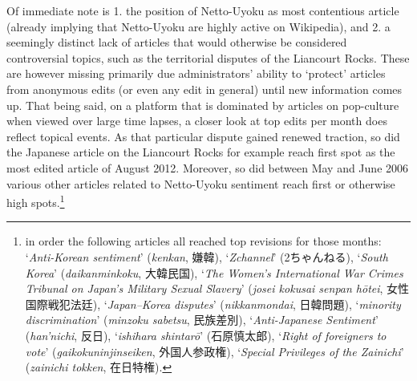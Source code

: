 \documentclass[10pt,british,A4paper,,openany]{memoir}
\begin{document}
Of immediate note is 1. the position of Netto-Uyoku as  most
contentious article (already implying that Netto-Uyoku are highly active
on Wikipedia), and 2. a seemingly distinct lack of articles that would
otherwise be considered controversial topics, such as the territorial
disputes of the Liancourt Rocks. These are however missing primarily due
administrators' ability to `protect' articles from anonymous edits (or
even any edit in general) until new information comes up. That being
said, on a platform that is dominated by articles on pop-culture when
viewed over large time lapses, a closer look at top edits per month does
reflect topical events. As that particular dispute gained renewed
traction, so did the Japanese article on the Liancourt Rocks for example
reach first spot as the most edited article of August 2012. Moreover, so
did between May and June 2006 various other articles related to
Netto-Uyoku sentiment reach first or otherwise high spots.\footnote{in
  order the following articles all reached top revisions for those
  months: `\emph{Anti-Korean sentiment}' (\emph{kenkan}, 嫌韓),
  `\emph{Zchannel}' (2ちゃんねる), `\emph{South Korea}'
  (\emph{daikanminkoku}, 大韓民国), `\emph{The Women's International War
  Crimes Tribunal on Japan's Military Sexual Slavery}' (\emph{josei
  kokusai senpan hōtei}, 女性国際戦犯法廷), `\emph{Japan--Korea
  disputes}' (\emph{nikkanmondai}, 日韓問題), `\emph{minority
  discrimination}' (\emph{minzoku sabetsu}, 民族差別),
  `\emph{Anti-Japanese Sentiment}' (\emph{han'nichi}, 反日),
  `\emph{ishihara shintarō}' (石原慎太郎), `\emph{Right of foreigners to
  vote}' (\emph{gaikokuninjinseiken}, 外国人参政権), `\emph{Special
  Privileges of the Zainichi}' (\emph{zainichi tokken}, 在日特権).}
\end{document}
